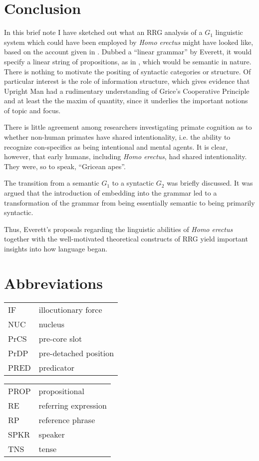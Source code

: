\documentclass[output=paper,colorlinks,citecolor=brown]{langscibook}
\begin{document}
\section{Conclusion}\label{sec:vanvalin:6}
In this brief note I have sketched out what an RRG analysis of a $G_1$ linguistic system which could have been employed by \emph{Homo erectus} might have looked like, based on the account given in \citet{everett2017language}.  Dubbed a “linear grammar” by Everett, it would specify a linear string of propositions, as in , which would be semantic in nature.  There is nothing to motivate the positing of syntactic categories or structure.  Of particular interest is the role of information structure, which gives evidence that Upright Man had a rudimentary understanding of Grice’s Cooperative Principle and at least the the maxim of quantity, since it underlies the important notions of topic and focus.  

There is little agreement among researchers investigating primate cognition as to whether non-human primates have shared intentionality, i.e. the ability to recognize con-specifics as being intentional and mental agents.  It is clear, however, that early humans, including \emph{Homo erectus}, had shared intentionality.  They were, so to speak, “Gricean apes”.

The transition from a semantic $G_1$ to a syntactic $G_2$ was briefly discussed.  It was argued that the introduction of embedding into the grammar led to a transformation of the grammar from being essentially semantic to being primarily syntactic.

Thus, Everett’s proposals regarding the linguistic abilities of \emph{Homo erectus} together with the well-motivated theoretical constructs of RRG yield important insights into how language began.

\section*{Abbreviations}
\begin{tabularx}{.5\textwidth}{@{}lQ}
\textsc{IF} & illocutionary force \\
\textsc{NUC} & nucleus \\
\textsc{P}r\textsc{CS} & pre-core slot \\
\textsc{P}r\textsc{DP} & pre-detached position \\
\textsc{PRED} & predicator \\
\end{tabularx}\begin{tabularx}{.5\textwidth}{lQ@{}}
\textsc{PROP} & propositional \\
\textsc{RE} & referring expression \\
\textsc{RP} & reference phrase \\
\textsc{SPKR} & speaker \\
\textsc{TNS} & tense \\
\end{tabularx}

\printbibliography[heading=subbibliography,notkeyword=this]
\end{document}
